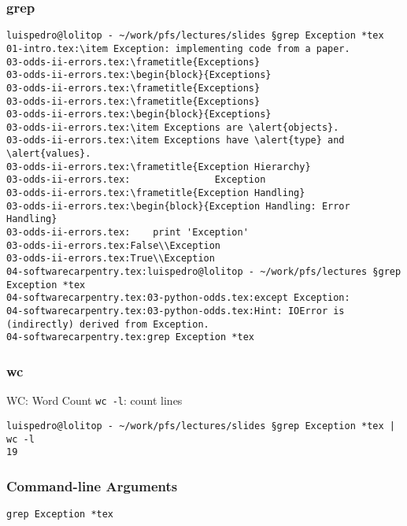 \begin{frame}[fragile]
\frametitle{grep}

\begin{verbatim}
luispedro@lolitop - ~/work/pfs/lectures/slides §grep Exception *tex
01-intro.tex:\item Exception: implementing code from a paper.
03-odds-ii-errors.tex:\frametitle{Exceptions}
03-odds-ii-errors.tex:\begin{block}{Exceptions}
03-odds-ii-errors.tex:\frametitle{Exceptions}
03-odds-ii-errors.tex:\frametitle{Exceptions}
03-odds-ii-errors.tex:\begin{block}{Exceptions}
03-odds-ii-errors.tex:\item Exceptions are \alert{objects}.
03-odds-ii-errors.tex:\item Exceptions have \alert{type} and \alert{values}.
03-odds-ii-errors.tex:\frametitle{Exception Hierarchy}
03-odds-ii-errors.tex:               Exception
03-odds-ii-errors.tex:\frametitle{Exception Handling}
03-odds-ii-errors.tex:\begin{block}{Exception Handling: Error Handling}
03-odds-ii-errors.tex:    print 'Exception'
03-odds-ii-errors.tex:False\\Exception
03-odds-ii-errors.tex:True\\Exception
04-softwarecarpentry.tex:luispedro@lolitop - ~/work/pfs/lectures §grep Exception *tex
04-softwarecarpentry.tex:03-python-odds.tex:except Exception:
04-softwarecarpentry.tex:03-python-odds.tex:Hint: IOError is (indirectly) derived from Exception.
04-softwarecarpentry.tex:grep Exception *tex
\end{verbatim}

\end{frame}

\begin{frame}[fragile]
\frametitle{wc}
\begin{block}{WC: Word Count}
\texttt{wc -l}: count lines
\end{block}
\end{frame}

\begin{frame}[fragile]
\begin{verbatim}
luispedro@lolitop - ~/work/pfs/lectures/slides §grep Exception *tex | wc -l
19
\end{verbatim}
\end{frame}

\begin{frame}[fragile]
\frametitle{Command-line Arguments}
\begin{verbatim}
grep Exception *tex
\end{verbatim}
\end{frame}

